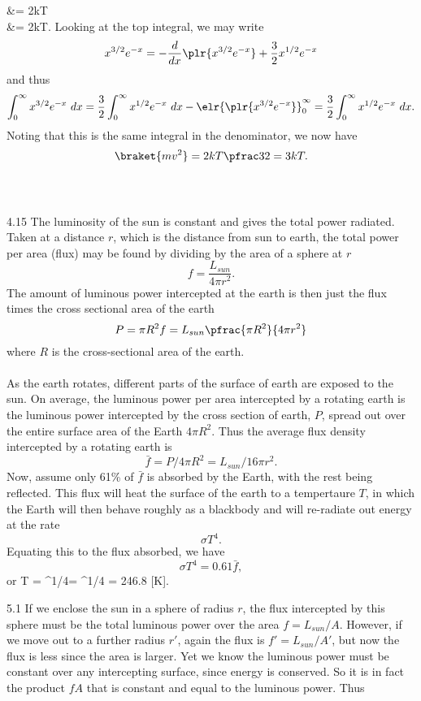 \documentclass[10pt,letterpaper]{article}
\begin{document}
	&= 2kT \\
	&= 2kT.
\ea
Looking at the top integral, we may write
\[
	x^{3/2}e^{-x} = -\frac{d}{dx}\plr{ x^{3/2}e^{-x}}+\frac32 x^{1/2}e^{-x}
\]
and thus
\[
	 \int_0^\infty x^{3/2}e^{-x}\ dx = \frac32 \int_0^\infty x^{1/2}e^{-x}\ dx - \elr{\plr{ x^{3/2}e^{-x}}}_0^\infty = \frac32 \int_0^\infty x^{1/2}e^{-x}\ dx.
\]
Noting that this is the same integral in the denominator, we now have
\[
	\braket{mv^2} = 2kT\pfrac32 = 3kT.
\]
\\ \\
\item[4.15]
The luminosity of the sun is constant and gives the total power radiated. Taken at a distance $r$, which is the distance from sun to earth, the total power per area (flux) may be found by dividing by the area of a sphere at $r$
\[
	f = \frac{L_{sun}}{4\pi r^2}.
\]
The amount of luminous power intercepted at the earth is then just the flux times the cross sectional area of the earth
\[
	P = \pi R^2 f = L_{sun}\pfrac{\pi R^2}{4\pi r^2}
\]
where $R$ is the cross-sectional area of the earth. \\ \\
As the earth rotates, different parts of the surface of earth are exposed to the sun. On average, the luminous power per area intercepted by a rotating earth is the luminous power intercepted by the cross section of earth, $P$, spread out over the entire surface area of the Earth $4\pi R^2$. Thus the average flux density intercepted by a rotating earth is
\[
	\bar f = P/4\pi R^2 = L_{sun}/16\pi r^2.
\]
Now, assume only 61\% of $\bar f$ is absorbed by the Earth, with the rest being reflected. This flux will heat the surface of the earth to a tempertaure $T$, in which the Earth will then behave roughly as a blackbody and will re-radiate out energy at the rate 
\[
	\sigma T^4.
\]
Equating this to the flux absorbed, we have
\[
	\sigma T^4 = 0.61 \bar f,
\]
or
\be
	T =  ^{1/4}= ^{1/4} = 246.8 [\text K].
\ee
\\
\item[5.1]
If we enclose the sun in a sphere of radius $r$, the flux intercepted by this sphere must be the total luminous power over the area $f = L_{sun}/A$. However, if we move out to a further radius $r'$, again the flux is $f' = L_{sun}/A'$, but now the flux is less since the area is larger. Yet we know the luminous power must be constant over any intercepting surface, since energy is conserved. So it is in fact the product $fA$ that is constant and equal to the luminous power. Thus
\end{document}
